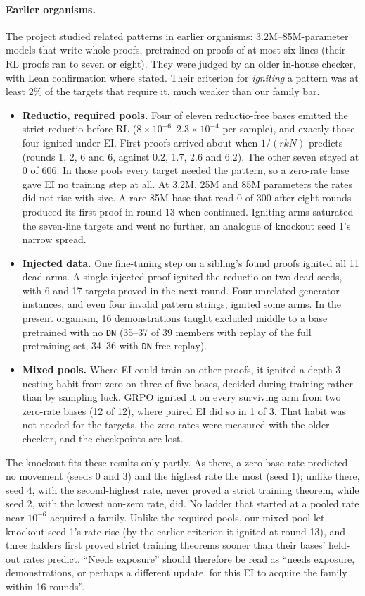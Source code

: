 \paragraph{Earlier organisms.} The project studied related patterns in earlier organisms: 3.2M--85M-parameter models
that write whole proofs, pretrained on proofs of at most six lines (their RL proofs ran to seven or eight). They were
judged by an older in-house checker, with Lean confirmation where stated. Their criterion for \emph{igniting} a pattern
was at least 2\% of the targets that require it, much weaker than our family bar.
\begin{itemize}
\item \textbf{Reductio, required pools.} Four of eleven reductio-free bases emitted the strict reductio before RL
($8\times10^{-6}$--$2.3\times10^{-4}$ per sample), and exactly those four ignited under EI. First proofs arrived about
when $1/(rkN)$ predicts (rounds 1, 2, 6 and 6, against 0.2, 1.7, 2.6 and 6.2). The other seven stayed at 0 of 606.
In those pools every target needed the pattern, so a zero-rate base gave EI no training step at all. At 3.2M, 25M and
85M parameters the rates did not rise with size. A rare 85M base that read 0 of 300 after eight rounds produced its
first proof in round 13 when continued. Igniting arms saturated the seven-line targets and went no further, an analogue
of knockout seed 1's narrow spread.
\item \textbf{Injected data.} One fine-tuning step on a sibling's found proofs ignited all 11 dead arms. A single injected
proof ignited the reductio on two dead seeds, with 6 and 17 targets proved in the next round. Four unrelated generator
instances, and even four invalid pattern strings, ignited some arms. In the present organism, 16 demonstrations taught
excluded middle to a base pretrained with no \texttt{DN} (35--37 of 39 members with replay of the full pretraining set,
34--36 with \texttt{DN}-free replay).
\item \textbf{Mixed pools.} Where EI could train on other proofs, it ignited a depth-3 nesting habit from zero on three
of five bases, decided during training rather than by sampling luck. GRPO ignited it on every surviving arm from two
zero-rate bases (12 of 12), where paired EI did so in 1 of 3. That habit was not needed for the targets, the zero rates
were measured with the older checker, and the checkpoints are lost.
\end{itemize}
The knockout fits these results only partly. As there, a zero base rate predicted no movement (seeds 0 and 3) and the
highest rate the most (seed 1); unlike there, seed 4, with the second-highest rate, never proved a strict training
theorem, while seed 2, with the lowest non-zero rate, did. No ladder that started at a pooled rate near $10^{-6}$ acquired
a family. Unlike the required pools, our mixed pool let knockout
seed 1's rate rise (by the earlier criterion it ignited at round 13), and three ladders first proved strict training
theorems sooner than their bases' held-out rates predict. ``Needs exposure'' should therefore be read as ``needs exposure,
demonstrations, or perhaps a different update, for this EI to acquire the family within 16 rounds''.

